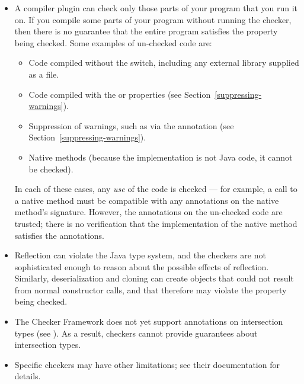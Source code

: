 \begin{itemize}

\item
  A compiler plugin can check only those parts of your program that you run
  it on.  If you compile some parts of your program without running the
  checker, then there is no guarantee that the entire program satisfies the
  property being checked.  Some examples of un-checked code are:

  \begin{itemize}
  \item
    Code compiled without the  switch, including any
    external library supplied as a  file.
  \item
    Code compiled with the  or 
    properties (see Section~\ref{suppressing-warnings}).
  \item
    Suppression of warnings, such as via the 
    annotation (see Section~\ref{suppressing-warnings}).
  \item
    Native methods (because the implementation is not Java code, it cannot
    be checked).
  \end{itemize}

  In each of these cases, any \emph{use} of the code is checked --- for
  example, a call to a native method must be compatible with any
  annotations on the native method's signature.
  However, the annotations on the un-checked code are trusted; there is no
  verification that the implementation of the native method satisfies the
  annotations.

\item
  Reflection can violate the Java type system, and
  the checkers are not sophisticated enough to reason about the possible
  effects of reflection.  Similarly, deserialization and cloning can
  create objects that could not result from normal constructor calls, and
  that therefore may violate the property being checked.

\item
  The Checker Framework does not yet support annotations on intersection
  types (see
  ).  As a result, checkers cannot provide guarantees about
  intersection types.

\item
  Specific checkers may have other limitations; see their documentation for
  details.

\end{itemize}

